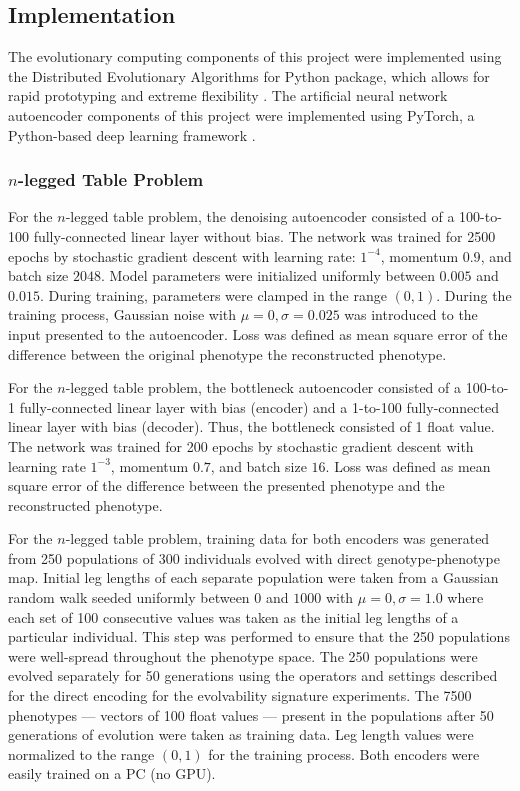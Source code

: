 \subsection{Implementation}

The evolutionary computing components of this project were implemented using the Distributed Evolutionary Algorithms for Python package, which allows for rapid prototyping and extreme flexibility \cite{fortin2012deap}.
The artificial neural network autoencoder components of this project were implemented using PyTorch, a Python-based deep learning framework \cite{paszke2017pytorch}.

\subsubsection{$n$-legged Table Problem}

For the $n$-legged table problem, the denoising autoencoder consisted of a 100-to-100 fully-connected linear layer without bias.
The network was trained for 2500 epochs by stochastic gradient descent with learning rate: $1^{-4}$, momentum $0.9$, and batch size $2048$.
Model parameters were initialized uniformly between $0.005$ and $0.015$.
During training, parameters were clamped in the range $(0,1)$.
During the training process, Gaussian noise with $\mu = 0, \sigma = 0.025$ was introduced to the input presented to the autoencoder.
Loss was defined as mean square error of the difference between the original phenotype the reconstructed phenotype.

For the $n$-legged table problem, the bottleneck autoencoder consisted of a 100-to-1 fully-connected linear layer with bias (encoder) and a 1-to-100 fully-connected linear layer with bias (decoder).
Thus, the bottleneck consisted of 1 float value.
The network was trained for 200 epochs by stochastic gradient descent with learning rate $1^{-3}$, momentum $0.7$, and batch size $16$.
Loss was defined as mean square error of the difference between the presented phenotype and the reconstructed phenotype.

For the $n$-legged table problem, training data for both encoders was generated from 250 populations of 300 individuals evolved with direct genotype-phenotype map.
Initial leg lengths of each separate population were taken from a Gaussian random walk seeded uniformly between $0$ and $1000$ with $\mu = 0, \sigma = 1.0$ where each set of 100 consecutive values was taken as the initial leg lengths of a particular individual.
This step was performed to ensure that the 250 populations were well-spread throughout the phenotype space.
The 250 populations were evolved separately for 50 generations using the operators and settings described for the direct encoding for the evolvability signature experiments.
The 7500 phenotypes --- vectors of 100 float values --- present in the populations after 50 generations of evolution were taken as training data.
Leg length values were normalized to the range $(0,1)$ for the training process.
Both encoders were easily trained on a PC (no GPU).


